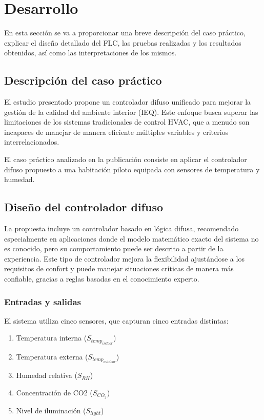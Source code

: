 \section{Desarrollo}

En esta sección se va a proporcionar una breve descripción del caso práctico, explicar el diseño detallado del FLC, las pruebas realizadas y los resultados obtenidos, así como las interpretaciones de los mismos. 

\subsection{Descripción del caso práctico}

El estudio presentado propone un controlador difuso unificado para mejorar la gestión de la calidad del ambiente interior (IEQ). Este enfoque busca superar las limitaciones de los sistemas tradicionales de control HVAC, que a menudo son incapaces de manejar de manera eficiente múltiples variables y criterios interrelacionados. 

El caso práctico analizado en la publicación consiste en aplicar el controlador difuso propuesto a una habitación piloto equipada con sensores de temperatura y humedad. 

\subsection{Diseño del controlador difuso}

La propuesta incluye un controlador basado en lógica difusa, recomendado especialmente en aplicaciones donde el modelo matemático exacto del sistema no es conocido, pero su comportamiento puede ser descrito a partir de la experiencia. Este tipo de controlador mejora la flexibilidad ajustándose a los requisitos de confort y puede manejar situaciones críticas de manera más confiable, gracias a reglas basadas en el conocimiento experto.

\subsubsection{Entradas y salidas}

El sistema utiliza cinco sensores, que capturan cinco entradas distintas:

\begin{enumerate}
	\item Temperatura interna ($S_{temp_{indoor}}$)
	\item Temperatura externa ($S_{temp_{outdoor}}$)
	\item Humedad relativa ($S_{RH}$)
	\item Concentración de CO2 ($S_{CO_2}$)
	\item Nivel de iluminación ($S_{light}$)
\end{enumerate}

